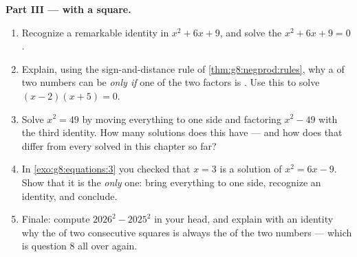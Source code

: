 \begin{problem}[{Weekend problem --- $(a+b)^2$, $(a-b)^2$,
$(a+b)(a-b)$, and the sum $1 + 3 + 5 + \dots + (2n-1) = n^2$}]
\medskip
\noindent\textbf{Part III ---  with a square.}
\begin{enumerate}[resume]
  \item Recognize a remarkable identity in $x^2 + 6x + 9$, and
        solve the  $x^2 + 6x + 9 = 0$.
  \item Explain, using the sign-and-distance rule of
        \cref{thm:g8:negprod:rules}, why a  of two numbers
        can be  \emph{only if} one of the two factors is .
        Use this to solve $(x - 2)(x + 5) = 0$.
  \item Solve $x^2 = 49$ by moving everything to one side and
        factoring $x^2 - 49$ with the third identity. How many
        solutions does this  have --- and how does that
        differ from every  solved in this chapter so far?
  \item In \cref{exo:g8:equations:3} you checked that $x = 3$ is
        a solution of $x^2 = 6x - 9$. Show that it is the
        \emph{only} one: bring everything to one side, recognize
        an identity, and conclude.
  \item Finale: compute $2026^2 - 2025^2$ in your head, and
        explain with an identity why the  of two
        consecutive squares is always the  of the two numbers
        --- which is question 8 all over again.
\end{enumerate}
\end{problem}
